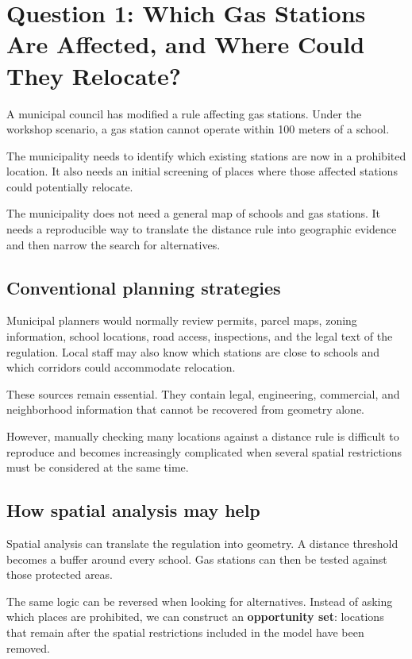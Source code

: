 \documentclass[11pt]{article}
\begin{document}
\section{Question 1: Which Gas Stations Are Affected, and Where Could They Relocate?}

\begin{executivebox}
A municipal council has modified a rule affecting gas stations. Under the workshop scenario, a gas station cannot operate within 100 meters of a school.

The municipality needs to identify which existing stations are now in a prohibited location. It also needs an initial screening of places where those affected stations could potentially relocate.

The municipality does not need a general map of schools and gas stations. It needs a reproducible way to translate the distance rule into geographic evidence and then narrow the search for alternatives.
\end{executivebox}

\subsection{Conventional planning strategies}

Municipal planners would normally review permits, parcel maps, zoning information, school locations, road access, inspections, and the legal text of the regulation. Local staff may also know which stations are close to schools and which corridors could accommodate relocation.

These sources remain essential. They contain legal, engineering, commercial, and neighborhood information that cannot be recovered from geometry alone.

However, manually checking many locations against a distance rule is difficult to reproduce and becomes increasingly complicated when several spatial restrictions must be considered at the same time.

\subsection{How spatial analysis may help}

Spatial analysis can translate the regulation into geometry. A distance threshold becomes a buffer around every school. Gas stations can then be tested against those protected areas.

The same logic can be reversed when looking for alternatives. Instead of asking which places are prohibited, we can construct an \textbf{opportunity set}: locations that remain after the spatial restrictions included in the model have been removed.
\end{document}
